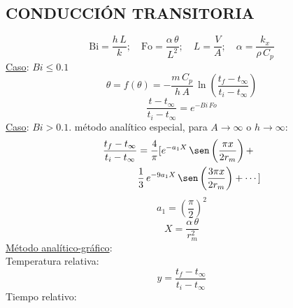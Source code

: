 \documentclass[letter,oneside,10pt]{article}
\begin{document}
\begin{multicols}{3}
\scriptsize
\vspace{-0.5cm}
\section*{CONDUCCIÓN TRANSITORIA}
\vspace{-0.5cm}
\begin{equation*}
    \text{Bi} = \frac{h\,L}{k};\quad
    \text{Fo} = \frac{\alpha\,\theta}{L^2};\quad
    L = \frac{V}{A};\quad
    \alpha = \frac{k_x}{\rho\,C_p}
\end{equation*}
\vspace{-0.3cm}
\underline{Caso}: $Bi\leq 0.1$
\begin{equation*}
    \theta = f(\theta) =
    -\frac{m\,C_p}{h\,A}\,\ln\left(\frac{t_f-t_{\infty}}{t_i-t_{\infty}}\right)
\end{equation*}
\vspace{-0.3cm}
\begin{equation*}
    \frac{t-t_{\infty}}{t_i-t_{\infty}} = e^{-Bi\,Fo}
\end{equation*}
\underline{Caso}: $Bi>0.1$. método analítico especial, para $A\rightarrow\infty$
o $h\rightarrow\infty$:
\vspace{-0.3cm}
\begin{equation*}
    \begin{split}
        \frac{t_f-t_\infty}{t_i-t_\infty}
            & = \frac{4}{\pi}[e^{-a_1 X}\,\sen\left(\frac{\pi x}{2r_m}\right)+\\
            & \frac{1}{3}\,e^{-9a_1 X}\,\sen\left(\frac{3\pi x}{2r_m}\right)+
            \cdots]
    \end{split}
\end{equation*}
\vspace{-0.3cm}
\begin{equation*}
    a_1 = \left(\frac{\pi}{2}\right)^2
\end{equation*}
\vspace{-0.3cm}
\begin{equation*}
    X = \frac{\alpha\,\theta}{r_m^2}
\end{equation*}
\underline{Método analítico-gráfico}:\\
Temperatura relativa:
\vspace{-0.3cm}
\begin{equation*}
    y = \frac{t_f-t_\infty}{t_i-t_\infty}
\end{equation*}
\vspace{-0.3cm}
Tiempo relativo:
\vspace{-0.5cm}

\end{multicols}
\end{document}

